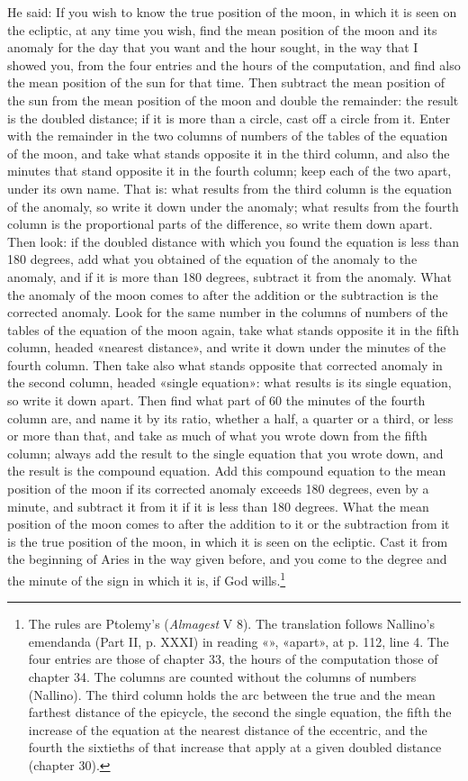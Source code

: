 \documentclass[11pt]{article}
\newcommand{\ArPage}[1]{\marginpar{\footnotesize\color{gray}Ar.\,p.\,#1}}
\begin{document}
\par \ArPage{112}He said: If you wish to know the true position of the moon, in which it is seen on the ecliptic, at any time you wish, find the mean position of the moon and its anomaly for the day that you want and the hour sought, in the way that I showed you, from the four entries and the hours of the computation, and find also the mean position of the sun for that time. Then subtract the mean position of the sun from the mean position of the moon and double the remainder: the result is the doubled distance; if it is more than a circle, cast off a circle from it. Enter with the remainder in the two columns of numbers of the tables of the equation of the moon, and take what stands opposite it in the third column, and also the minutes that stand opposite it in the fourth column; keep each of the two apart, under its own name. That is: what results from the third column is the equation of the anomaly, so write it down under the anomaly; what results from the fourth column is the proportional parts of the difference, so write them down apart. Then look: if the doubled distance with which you found the equation is less than 180 degrees, add what you obtained of the equation of the anomaly to the anomaly, and if it is more than 180 degrees, subtract it from the anomaly. What the anomaly of the moon comes to after the addition or the subtraction is the corrected anomaly. Look for the same number in the columns of numbers of the tables of the equation of the moon again, take what stands opposite it in the fifth column, headed «nearest distance», and write it down under the minutes of the fourth column. Then take also what stands opposite that corrected anomaly in the second column, headed «single equation»: what results is its single equation, so write it down apart. Then find what part of 60 the minutes of the fourth column are, and name it by its ratio, whether a half, a quarter or a third, or less or more than that, and take as much of what you wrote down from the fifth column; always add the result to the single equation that you wrote down, and the result is the compound equation. Add this compound equation to the mean position of the moon if its corrected anomaly exceeds 180 degrees, even by a minute, and subtract it from it if it is less than 180 degrees. What the mean position of the moon comes to after the addition to it or the subtraction from it is the true position of the moon, in which it is seen on the ecliptic. Cast it from the beginning of Aries in the way given before, and you come to the degree and the minute of the sign in which it is, if God wills.\footnote{The rules are Ptolemy's (\emph{Almagest} V 8). The translation follows Nallino's emendanda (Part II, p. XXXI) in reading «», «apart», at p. 112, line 4. The four entries are those of chapter 33, the hours of the computation those of chapter 34. The columns are counted without the columns of numbers (Nallino). The third column holds the arc between the true and the mean farthest distance of the epicycle, the second the single equation, the fifth the increase of the equation at the nearest distance of the eccentric, and the fourth the sixtieths of that increase that apply at a given doubled distance (chapter 30).}\par
\end{document}
